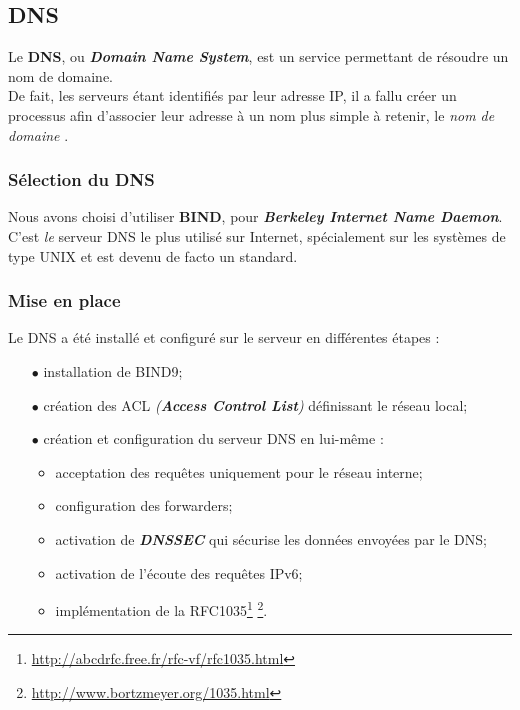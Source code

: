 \subsection{DNS}
\label{subsec:dns}

Le \textbf{DNS}, ou \textit{\textbf{Domain Name System}}, est un service
permettant de résoudre un nom de domaine. \\
De fait, les serveurs étant identifiés par leur adresse IP, il a fallu créer un
processus afin d'associer leur adresse à un nom plus simple à retenir,
le \og \textit{nom de domaine} \fg.


\subsubsection{Sélection du DNS}
\label{subsubsec:selection-dns}

Nous avons choisi d'utiliser \textbf{BIND}, pour \textit{\textbf{Berkeley
Internet Name Daemon}}. \\
C'est \textit{le} serveur DNS le plus utilisé sur Internet, spécialement sur les
systèmes de type UNIX et est devenu de facto un standard.


\subsubsection{Mise en place}
\label{subsubsec:miseen-place}

Le DNS a été installé et configuré sur le serveur en différentes étapes :
\begin{itemize}

    \item[$\bullet$] installation de BIND9;
    \item[$\bullet$] création des ACL \textit{(\textbf{Access Control List})}
    définissant le réseau local;
    \item[$\bullet$] création et configuration du serveur DNS en lui-même :
    \begin{itemize}

        \item acceptation des requêtes uniquement pour le réseau interne;
        \item configuration des forwarders;
        \item activation de \textit{\textbf{DNSSEC}} qui sécurise les
        données envoyées par le DNS;
        \item activation de l'écoute des requêtes IPv6;
        \item implémentation de la
        RFC1035\footnote{\url{http://abcdrfc.free.fr/rfc-vf/rfc1035.html}}
        \footnote{\url{http://www.bortzmeyer.org/1035.html}}. \\

    \end{itemize}

\end{itemize}



